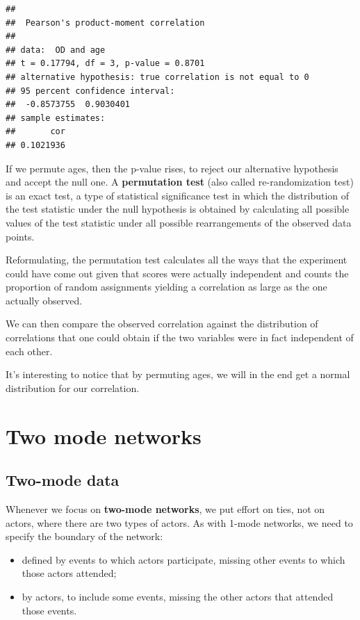 \documentclass[
  notitlepage,
  onecolumn,
  openany]{book}
\providecommand{\tightlist}{%
  \setlength{\itemsep}{0pt}\setlength{\parskip}{0pt}}
\begin{document}
\begin{verbatim}
## 
##  Pearson's product-moment correlation
## 
## data:  OD and age
## t = 0.17794, df = 3, p-value = 0.8701
## alternative hypothesis: true correlation is not equal to 0
## 95 percent confidence interval:
##  -0.8573755  0.9030401
## sample estimates:
##       cor 
## 0.1021936
\end{verbatim}

If we permute ages, then the p-value rises, to reject our alternative hypothesis and accept the null one. A \textbf{permutation test} (also called re-randomization test) is an exact test, a type of statistical significance test in which the distribution of the test statistic under the null hypothesis is obtained by calculating all possible values of the test statistic under all possible rearrangements of the observed data points.

Reformulating, the permutation test calculates all the ways that the experiment could have come out given that scores were actually independent and counts the proportion of random assignments yielding a correlation as large as the one actually observed.

We can then compare the observed correlation against the distribution of correlations that one could obtain if the two variables were in fact independent of each other.

It's interesting to notice that by permuting ages, we will in the end get a normal distribution for our correlation.

\hypertarget{two-mode-networks}{%
\chapter{Two mode networks}\label{two-mode-networks}}

\hypertarget{two-mode-data}{%
\section{Two-mode data}\label{two-mode-data}}

Whenever we focus on \textbf{two-mode networks}, we put effort on ties, not on actors, where there are two types of actors. As with 1-mode networks, we need to specify the boundary of the network:

\begin{itemize}
\tightlist
\item
  defined by events to which actors participate, missing other events to which those actors attended;
\item
  by actors, to include some events, missing the other actors that attended those events.
\end{itemize}
\end{document}
